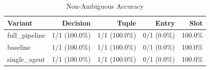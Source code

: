 \begin{table}[htbp]
\centering
\caption{Non-Ambiguous Accuracy}
\label{tab:acc-non-ambig}
\begin{tabular}{l rrrr}
\toprule
Variant & Decision & Tuple & Entry & Slot \\
\midrule
  full\_pipeline & 1/1 (100.0\%) & 1/1 (100.0\%) & 0/1 (0.0\%) & 100.0\% \\
  baseline & 1/1 (100.0\%) & 1/1 (100.0\%) & 0/1 (0.0\%) & 100.0\% \\
  single\_agent & 1/1 (100.0\%) & 1/1 (100.0\%) & 0/1 (0.0\%) & 100.0\% \\
\bottomrule
\end{tabular}
\end{table}
